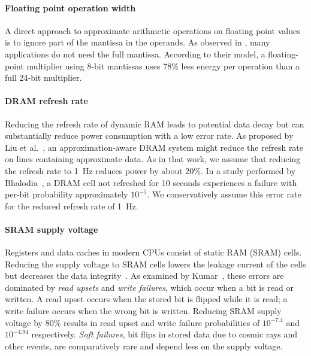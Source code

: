 \paragraph{Floating point operation width}
A direct approach to approximate arithmetic operations on floating point values
is to ignore part of the mantissa in the operands. As observed in
\cite{bitwidthred}, many applications do not need the full mantissa.
According to their model,
a floating-point multiplier using 8-bit mantissas uses 78\% less
energy per operation than a full 24-bit multiplier.




\paragraph{DRAM refresh rate}
Reducing the refresh rate of dynamic RAM leads to potential data decay
but can substantially reduce power consumption with a low error rate.
As proposed by Liu et al.~\cite{flikker}, an approximation-aware DRAM system
might reduce the refresh rate on lines containing approximate data. As in
that work, we assume that reducing the refresh rate to 1~Hz
reduces power by about 20\%.
In a study performed by Bhalodia~\cite{dramthesis}, a DRAM cell not
refreshed for 10 seconds experiences a failure with per-bit
probability approximately $10^{-5}$. We conservatively assume this error
rate for the reduced refresh rate of 1~Hz.

\paragraph{SRAM supply voltage}
Registers and data caches in modern CPUs consist of static RAM (SRAM)
cells. Reducing the supply voltage to SRAM cells lowers the leakage
current of the cells but decreases the data integrity~\cite{drowsycaches}. As
examined by Kumar~\cite{sramthesis}, these
errors are dominated by \emph{read upsets} and \emph{write failures},
which occur when a bit is read or written. A read upset occurs when
the stored bit is flipped while it is read; a write failure occurs when the
wrong bit is written.
Reducing SRAM supply voltage by 80\% results in
read upset and write failure probabilities of $10^{-7.4}$ and
$10^{-4.94}$ respectively.
\emph{Soft failures}, bit flips in
stored data due to cosmic rays and other events, are comparatively
rare and depend less on the supply voltage.

